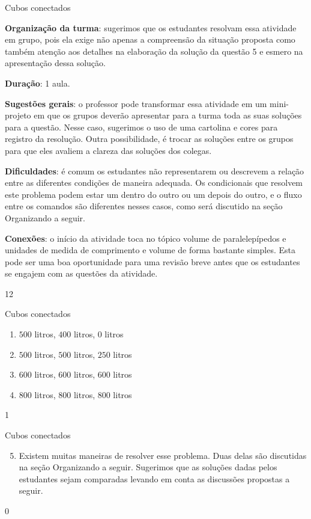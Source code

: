 \begin{sugestions}{Cubos conectados}
{
\textbf{Organização da turma}: sugerimos que os estudantes resolvam essa atividade em grupo, pois ela exige não apenas a compreensão da situação proposta como também atenção aos detalhes na elaboração da solução da questão 5 e esmero na apresentação dessa solução.

\textbf{Duração}: 1 aula.

\textbf{Sugestões gerais}: o professor pode transformar essa atividade em um mini-projeto em que os grupos deverão apresentar para a turma toda as suas soluções para a questão. Nesse caso, sugerimos o uso de uma cartolina e cores para registro da resolução. Outra possibilidade, é trocar as soluções entre os grupos para que eles avaliem a clareza das soluções dos colegas.

\textbf{Dificuldades}: é comum os estudantes não representarem ou descrevem a relação entre as diferentes condições de maneira adequada. Os condicionais que resolvem este problema podem estar um dentro do outro ou um depois do outro, e o fluxo entre os comandos são diferentes nesses casos, como será discutido na seção Organizando a seguir.

\textbf{Conexões}: o início da atividade toca no tópico volume de paralelepípedos e unidades de medida de comprimento e volume de forma bastante simples. Esta pode ser uma boa oportunidade para uma revisão breve antes que os estudantes se engajem com as questões da atividade.
}{1}{2}
\end{sugestions}
\begin{answer}{Cubos conectados}
{
\begin{enumerate}
\item $500$ litros, $400$ litros, $0$ litros

\item $500$ litros, $500$ litros, $250$ litros

\item $600$ litros, $600$ litros, $600$ litros

\item $800$ litros, $800$ litros, $800$ litros

\end{enumerate}

}{1}
\end{answer}

\begin{answer}{Cubos conectados}
{
\begin{enumerate}\setcounter{enumi}{4}
\item Existem muitas maneiras de resolver esse problema. Duas delas são discutidas na seção Organizando a seguir. Sugerimos que as soluções dadas pelos estudantes sejam comparadas levando em conta as discussões propostas a seguir.
\end{enumerate}
}{0}
\end{answer}

